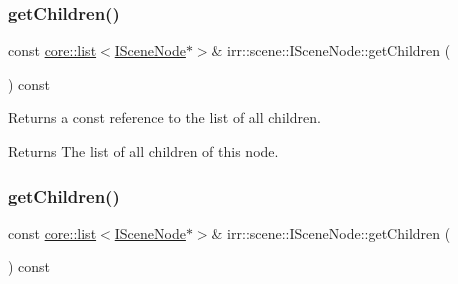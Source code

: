 \mbox{\label{classirr_1_1scene_1_1ISceneNode_a9a0e01ebfbf9f05e0caa147b290ffaf5}} 
\subsubsection{\texorpdfstring{get\+Children()}{getChildren()}\hspace{0.1cm}{\footnotesize\ttfamily [1/2]}}
{\footnotesize\ttfamily const \hyperlink{classirr_1_1core_1_1list}{core\+::list}$<$\hyperlink{classirr_1_1scene_1_1ISceneNode}{I\+Scene\+Node}$\ast$$>$\& irr\+::scene\+::\+I\+Scene\+Node\+::get\+Children (\begin{DoxyParamCaption}{ }\end{DoxyParamCaption}) const\hspace{0.3cm}{\ttfamily [inline]}}



Returns a const reference to the list of all children. 

\begin{DoxyReturn}{Returns}
The list of all children of this node. 
\end{DoxyReturn}
\mbox{\label{classirr_1_1scene_1_1ISceneNode_a9a0e01ebfbf9f05e0caa147b290ffaf5}} 
\subsubsection{\texorpdfstring{get\+Children()}{getChildren()}\hspace{0.1cm}{\footnotesize\ttfamily [2/2]}}
{\footnotesize\ttfamily const \hyperlink{classirr_1_1core_1_1list}{core\+::list}$<$\hyperlink{classirr_1_1scene_1_1ISceneNode}{I\+Scene\+Node}$\ast$$>$\& irr\+::scene\+::\+I\+Scene\+Node\+::get\+Children (\begin{DoxyParamCaption}{ }\end{DoxyParamCaption}) const\hspace{0.3cm}{\ttfamily [inline]}}




